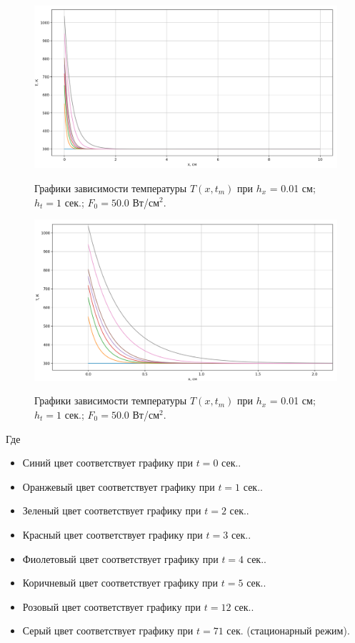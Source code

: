 \documentclass[a4paper,12pt]{article}
\begin{document}
	
	\begin{figure}[h!]
		\begin{center}
			{\includegraphics[scale = 0.4]{1.png}}
			\label{ris:1}
		\end{center}
		\caption{Графики зависимости температуры $T(x, t_m)$ при $h_x$ = 0.01 см; $h_t = 1$ сек.; $F_0 = 50.0$ Вт/см$^2$.}
	\end{figure}
	
	\newpage
	
	\begin{figure}[h!]
		\begin{center}
			{\includegraphics[scale = 0.4]{2.png}}
			\label{ris:2}
		\end{center}
		\caption{Графики зависимости температуры $T(x, t_m)$ при $h_x$ = 0.01 см; $h_t = 1$ сек.; $F_0 = 50.0$ Вт/см$^2$.}
	\end{figure}

	Где 
	\begin{itemize}
		\item Синий цвет соответствует графику при $t = 0$ сек..
		\item Оранжевый цвет соответствует графику при $t = 1$ сек..
		\item Зеленый цвет соответствует графику при $t = 2$ сек..
		\item Красный цвет соответствует графику при $t = 3$ сек..
		\item Фиолетовый цвет соответствует графику при $t = 4$ сек..
		\item Коричневый цвет соответствует графику при $t = 5$ сек..
		\item Розовый цвет соответствует графику при $t = 12$ сек..
		\item Серый цвет соответствует графику при $t = 71$ сек. (стационарный режим).
	\end{itemize}
	\newpage
	
\end{document}
